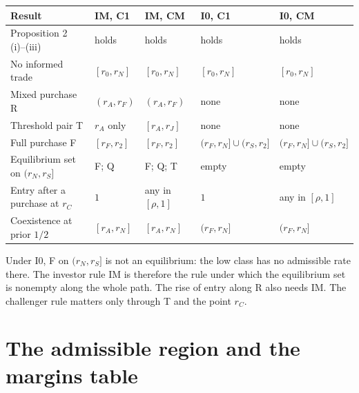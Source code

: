 \documentclass[11pt]{article}
\theoremstyle{definition}
\begin{document}
\begin{center}
\small
\begin{tabular}{@{}lllll@{}}
\toprule
Result & IM, C1 & IM, CM & I0, C1 & I0, CM\\
\midrule
Proposition 2 (i)--(iii) & holds & holds & holds & holds\\
No informed trade & $[r_0,r_N]$ & $[r_0,r_N]$ & $[r_0,r_N]$ & $[r_0,r_N]$\\
Mixed purchase R & $(r_A,r_F)$ & $(r_A,r_F)$ & none & none\\
Threshold pair T & $r_A$ only & $[r_A,r_J]$ & none & none\\
Full purchase F & $[r_F,r_2]$ & $[r_F,r_2]$ & $(r_F,r_N]\cup(r_S,r_2]$ & $(r_F,r_N]\cup(r_S,r_2]$\\
Equilibrium set on $(r_N,r_S]$ & F; Q & F; Q; T & empty & empty\\
Entry after a purchase at $r_C$ & $1$ & any in $[\rho,1]$ & $1$ & any in $[\rho,1]$\\
Coexistence at prior $1/2$ & $[r_A,r_N]$ & $[r_A,r_N]$ & $(r_F,r_N]$ & $(r_F,r_N]$\\
\bottomrule
\end{tabular}
\end{center}
Under I0, F on $(r_N,r_S]$ is not an equilibrium: the low class has no admissible rate there. The investor rule
IM is therefore the rule under which the equilibrium set is nonempty along the whole path. The rise of entry along
R also needs IM. The challenger rule matters only through T and the point $r_C$.

\section{The admissible region and the margins table}\label{sec:region}
\end{document}
